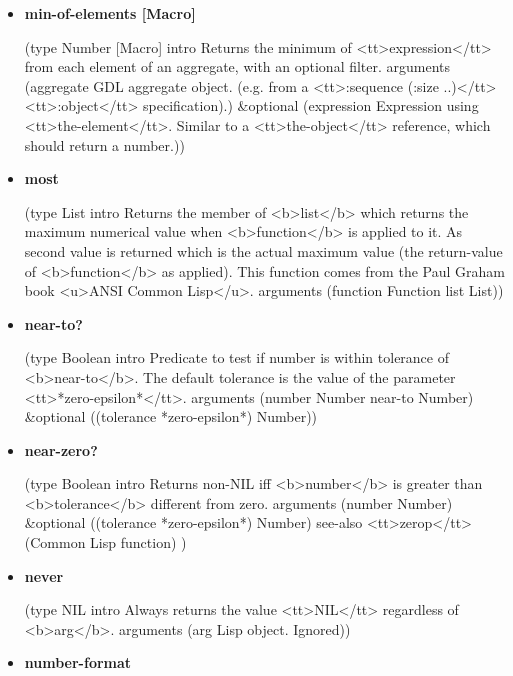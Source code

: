 \documentclass [11pt]{book}
\begin{document}
\begin{itemize}
\item {}
\label{prim:min-of-elements}
\textbf{min-of-elements [Macro]}

(type Number [Macro] intro
  Returns the minimum of <tt>expression</tt> from each element of an aggregate,
with an optional filter.
 arguments
 (aggregate
  GDL aggregate object. (e.g. from a <tt>:sequence (:size ..)</tt> <tt>:object</tt> specification).)
 \&optional
 (expression
  Expression using <tt>the-element</tt>. Similar to a <tt>the-object</tt> reference, which should return a number.))



\item {}
\label{prim:most}
\textbf{most}

(type List intro
  Returns the member of <b>list</b> which returns the maximum numerical value
when <b>function</b> is applied to it. As second value is returned which is the
actual maximum value (the return-value of <b>function</b> as applied). This function
comes from the Paul Graham book <u>ANSI Common Lisp</u>.
 arguments (function Function list List))



\item {}
\label{prim:near-to?}
\textbf{near-to?}

(type Boolean intro  Predicate to test if number is within tolerance of
<b>near-to</b>. The default tolerance is the value of the parameter
<tt>*zero-epsilon*</tt>.
 arguments (number Number near-to Number) \&optional
 ((tolerance *zero-epsilon*) Number))



\item {}
\label{prim:near-zero?}
\textbf{near-zero?}

(type Boolean intro
  Returns non-NIL iff <b>number</b> is greater than <b>tolerance</b> different
from zero.
 arguments (number Number) \&optional
 ((tolerance *zero-epsilon*) Number) see-also
 <tt>zerop</tt> (Common Lisp function) 
)



\item {}
\label{prim:never}
\textbf{never}

(type NIL intro
  Always returns the value <tt>NIL</tt> regardless of <b>arg</b>.
 arguments (arg Lisp object. Ignored))



\item {}
\label{prim:number-format}
\textbf{number-format}


\end{itemize}
\end{document}
